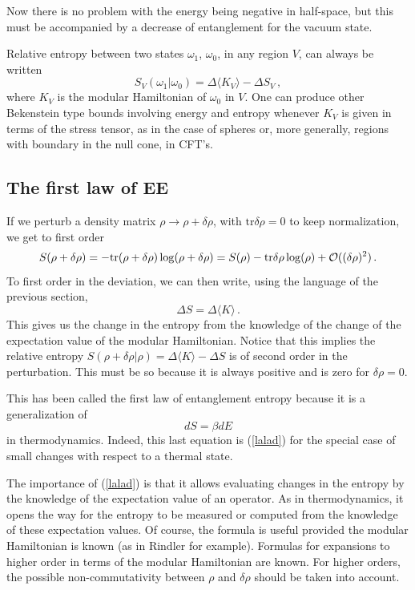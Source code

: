 \documentclass[12pt]{article}
\numberwithin{equation}{section}
\newcommand{\be}{\begin{equation}}
\newcommand{\ee}{\end{equation}}
\begin{document}
Now there is no problem with the energy being negative in half-space, but this must be accompanied by a decrease of entanglement for the vacuum state.  

Relative entropy between two states $\omega_1$, $\omega_0$, in any region $V$, can always be written 
\be
S_V(\omega_1|\omega_0)=\Delta \langle K_V \rangle - \Delta S_V\,,
\ee
where $K_V$ is the modular Hamiltonian of $\omega_0$ in $V$. One can produce other Bekenstein type bounds involving energy and entropy whenever $K_V$ is given in terms of the stress tensor, as in the case of spheres or, more generally, regions with boundary in the null cone, in CFT's. 


\subsection{The first law of EE}

If we perturb a density matrix $\rho \rightarrow \rho+\delta \rho$, with $\textrm{tr} \delta \rho=0$ to keep normalization, we get to first order
\be
S(\rho+\delta\rho)= - \textrm{tr}  (\rho+\delta\rho) \log(\rho+\delta\rho)
=S(\rho)- \textrm{tr}  \delta\rho \log(\rho)+{\cal O}((\delta \rho)^2)\,.
\ee
To first order in the deviation, we can then write, using the language of the previous section, 
\be
\Delta S=\Delta \langle K\rangle\,.\label{lalad}
\ee
This gives us the change in the entropy from the knowledge of the change of the expectation value of the modular Hamiltonian. Notice that this implies the relative entropy $S(\rho+\delta \rho |\rho)=\Delta \langle K \rangle-\Delta S$ is of second order in the perturbation. This must be so because it is always positive and is zero for $\delta \rho=0$.

This has been called the first law of entanglement entropy because it is a generalization of 
\be
dS=\beta dE
\ee
in thermodynamics. Indeed, this last equation is (\ref{lalad}) for the special case of small changes with respect to a thermal state.    

The importance of (\ref{lalad}) is that it allows evaluating changes in the entropy by the knowledge of the expectation value of an operator. As in thermodynamics, it opens the way for the entropy to be measured or computed from the knowledge of these expectation values. Of course, the formula is useful provided the modular Hamiltonian is known (as in Rindler for example). Formulas for expansions to higher order in terms of the modular Hamiltonian are known. For higher orders, the possible non-commutativity between $\rho$ and $\delta \rho$ should be taken into account.  
\end{document}

